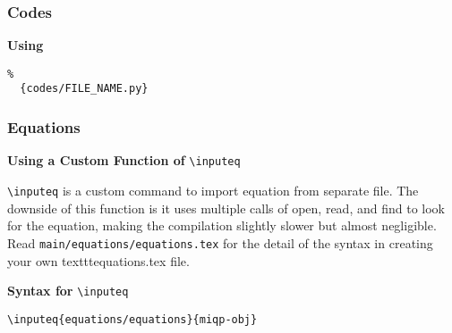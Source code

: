 \documentclass{beamer}
\begin{document}
\begin{frame}[fragile]
  \frametitle{Codes}

  \textbf{Using} \verb||

  \begin{block}{}
    \vspace{-2em}
    \small
    \begin{verbatim}
%
  {codes/FILE_NAME.py}
    \end{verbatim}
  \end{block}

\end{frame}

\begin{frame}[fragile]
  \frametitle{Equations}

  \textbf{Using a Custom Function of} \verb|\inputeq|

  \verb|\inputeq| is a custom command to import equation from separate file. The downside of this function is it uses multiple calls of open, read, and find to look for the equation, making the compilation slightly slower but almost negligible. Read \texttt{main/equations/equations.tex} for the detail of the syntax in creating your own texttt{equations.tex} file.

  \textbf{Syntax for} \verb|\inputeq|

  \begin{block}{}
    \vspace{-2em}
    \small
    \begin{verbatim}
\inputeq{equations/equations}{miqp-obj}
    \end{verbatim}
  \end{block}

\end{frame}

\end{document}
